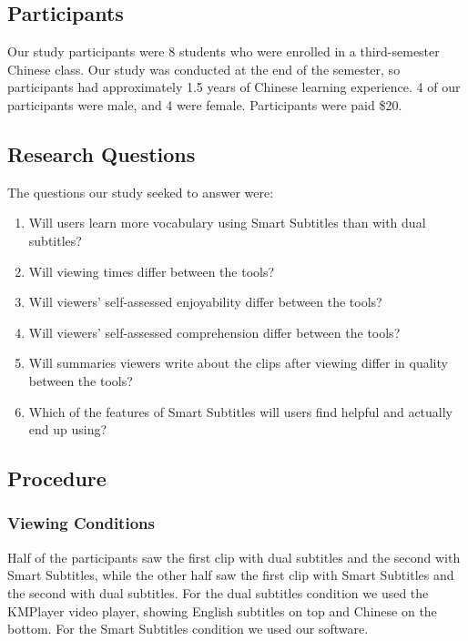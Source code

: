 \documentclass{sigchi}
\begin{document}
\subsection{Participants}

Our study participants were 8 students who were enrolled in a third-semester Chinese class. Our study was conducted at the end of the semester, so participants had approximately 1.5 years of Chinese learning experience. 4 of our participants were male, and 4 were female.
Participants were paid \$20.

\subsection{Research Questions}

The questions our study seeked to answer were:

\begin{enumerate}[noitemsep]
\item Will users learn more vocabulary using Smart Subtitles than with dual subtitles?
\item Will viewing times differ between the tools?
\item Will viewers' self-assessed enjoyability differ between the tools?
\item Will viewers' self-assessed comprehension differ between the tools?
\item Will summaries viewers write about the clips after viewing differ in quality between the tools?
\item Which of the features of Smart Subtitles will users find helpful and actually end up using?
\end{enumerate}

\subsection{Procedure}

\subsubsection{Viewing Conditions}

Half of the participants saw the first clip with dual
subtitles and the second with Smart Subtitles, while the
other half saw the first clip with Smart Subtitles and
the second with dual subtitles.
For the dual subtitles
condition we used the KMPlayer video player, showing English subtitles
on top and Chinese on the bottom. For the Smart
Subtitles condition we used our software.
\end{document}
